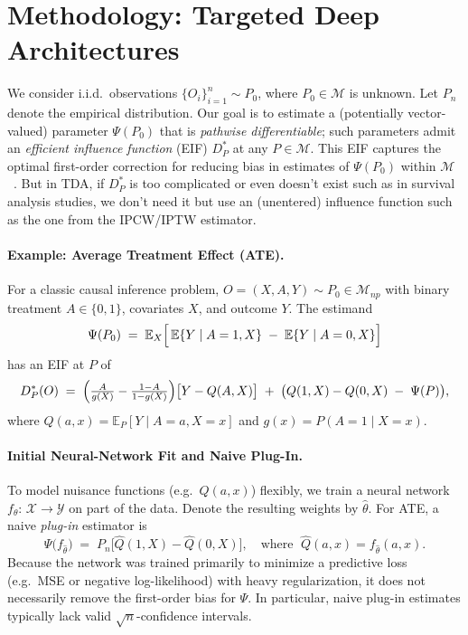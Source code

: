 \documentclass{article}
\theoremstyle{remark}
\newcommand{\E}{\mathbb{E}}
\begin{document}
\section{Methodology: Targeted Deep Architectures}
\label{sec:method}

We consider i.i.d.\ observations $\{O_i\}_{i=1}^n \sim P_0$, where $P_0\in \mathcal{M}$ is unknown. Let $P_n$ denote the empirical distribution. Our goal is to estimate a (potentially vector-valued) parameter $\Psi(P_0)$ that is \emph{pathwise differentiable}; such parameters admit an \emph{efficient influence function} (EIF) $D^*_P$ at any $P\in\mathcal{M}$.  This EIF captures the optimal first-order correction for reducing bias in estimates of $\Psi(P_0)$ within $\mathcal{M}$~\cite{van2011targeted,van2018targeted}.  But in TDA, if $D^*_P$ is too complicated or even doesn't exist such as in survival analysis studies\cite{laan2003unified}, we don't need it but use an (unentered) influence function such as the one from the IPCW/IPTW estimator.


\paragraph{Example: Average Treatment Effect (ATE).}
For a classic causal inference problem, $O=(X,A,Y)\sim P_0\in \mathcal{M}_{np}$ with binary treatment $A\in\{0,1\}$, covariates $X$, and outcome $Y$.  The estimand
\[
  \Psi(P_0)\;=\; 
  \E_X\Bigl[\,\E\{Y\mid A=1,X\} \;-\;\E\{Y\mid A=0,X\}\Bigr]
\]
has an EIF at $P$ of
\[
  D^*_P(O)
  \;=\;
  \Bigl(\tfrac{A}{g(X)}-\tfrac{1-A}{1-g(X)}\Bigr)\bigl[Y - Q(A,X)\bigr]
  \;+\;
  \big(Q(1,X)-Q(0,X)\;-\;\Psi(P)\big),
\]
where $Q(a,x)=\E_P[Y\mid A=a,X=x]$ and $g(x)=P(A=1\mid X=x)$.

\paragraph{Initial Neural-Network Fit and Naive Plug-In.}
To model nuisance functions (e.g.\ $Q(a,x)$) flexibly, we train a neural network $f_{\theta}:\,\mathcal{X}\to\mathcal{Y}$ on part of the data.  Denote the resulting weights by $\hat{\theta}$.  For ATE, a naive \emph{plug-in} estimator is
\[
  \Psi\bigl(f_{\hat{\theta}}\bigr)
  \;=\; P_n\!\bigl[\hat{Q}(1,X)-\hat{Q}(0,X)\bigr],
  \quad
  \text{where }\;\hat{Q}(a,x)=f_{\hat{\theta}}(a,x).
\]
Because the network was trained primarily to minimize a predictive loss (e.g.\ MSE or negative log-likelihood) with heavy regularization, it does not necessarily remove the first-order bias for $\Psi$. In particular, naive plug-in estimates typically lack valid $\sqrt{n}$-confidence intervals.
\end{document}
